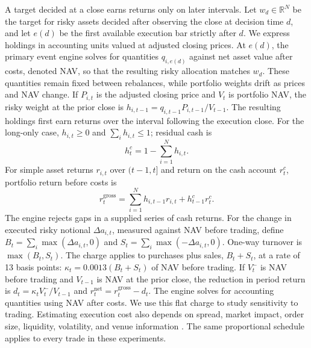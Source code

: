 \documentclass{article}
\begin{document}
A target decided at a close earns returns only on later intervals. Let
$w_d\in\mathbb{R}^N$ be the target for risky assets decided after observing the close
at decision time $d$, and let $e(d)$ be the first available execution bar
strictly after $d$. We express holdings in accounting units valued at adjusted closing prices. At $e(d)$, the primary event engine solves for quantities $q_{i,e(d)}$ against net asset value after costs, denoted NAV, so that the resulting risky
allocation matches $w_d$. These quantities remain fixed between rebalances, while portfolio weights drift as prices and NAV change. If $P_{i,t}$
is the adjusted closing price and $V_t$ is portfolio NAV, the risky weight at
the prior close is $h_{i,t-1}=q_{i,t-1}P_{i,t-1}/V_{t-1}$. The resulting holdings first earn returns over the
interval following the execution close.
For the long-only case, $h_{i,t}\geq 0$ and $\sum_i h_{i,t}\leq 1$; residual cash
is
\begin{equation}
  h^c_t = 1-\sum_{i=1}^N h_{i,t}.
\end{equation}
For simple asset returns $r_{i,t}$ over $(t-1,t]$ and return on the cash account
$r^c_t$, portfolio return before costs is
\begin{equation}
  r^{\mathrm{gross}}_t = \sum_{i=1}^N h_{i,t-1}r_{i,t}
  + h^c_{t-1}r^c_t.
  \label{eq:gross}
\end{equation}
The engine rejects gaps in a supplied series of cash returns. For the change
in executed risky notional $\Delta a_{i,t}$, measured against NAV before trading,
define $B_t=\sum_i\max(\Delta a_{i,t},0)$ and
$S_t=\sum_i\max(-\Delta a_{i,t},0)$. One-way turnover is
$\max(B_t,S_t)$. The charge applies to purchases plus sales,
$B_t+S_t$, at a rate of 13 basis points:
$\kappa_t=0.0013(B_t+S_t)$ of NAV before trading. If $V^-_t$ is NAV before trading and
$V_{t-1}$ is NAV at the prior close, the reduction in period return is
$d_t=\kappa_t V^-_t/V_{t-1}$ and
$r^{\mathrm{net}}_t=r^{\mathrm{gross}}_t-d_t$. The engine solves for accounting quantities using
NAV after costs. We use this flat charge to study sensitivity to trading. Estimating execution cost also depends on spread, market impact, order size, liquidity, volatility, and venue information \citep{almgren2001execution}. The same proportional schedule applies to every trade in these experiments.
\end{document}
